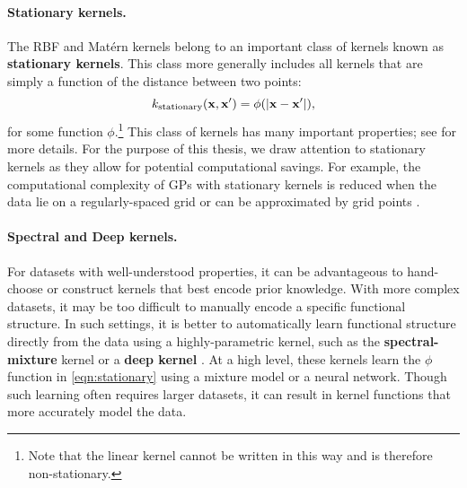 \paragraph{Stationary kernels.}
The RBF and Mat\'ern kernels belong to an important class of kernels known as {\bf stationary kernels}.
This class more generally includes all kernels that are simply a function of the distance between two points:
\begin{equation}
  k_\text{stationary} (\mathbf{x}, \mathbf{x}') = \phi( \vert \mathbf{x} - \mathbf{x}' \vert ),
  \label{eqn:stationary}
\end{equation}
for some function $\phi$.\footnote{
  Note that the linear kernel cannot be written in this way and is therefore non-stationary.
}
This class of kernels has many important properties; see \citep[e.g.][]{rasmussen2006gaussian,wilson2013gaussian} for more details.
For the purpose of this thesis, we draw attention to stationary kernels as they allow for potential computational savings.
For example, the computational complexity of GPs with stationary kernels is reduced when the data lie on a regularly-spaced grid \cite{cunningham2008fast,saatcci2012scalable} or can be approximated by grid points \cite{wilson2014thesis,wilson2015kernel}.


\paragraph{Spectral and Deep kernels.}
For datasets with well-understood properties, it can be advantageous to hand-choose or construct kernels that best encode prior knowledge.
With more complex datasets, it may be too difficult to manually encode a specific functional structure.
In such settings, it is better to automatically learn functional structure directly from the data using a highly-parametric kernel, such as the {\bf spectral-mixture} kernel \cite{wilson2013gaussian} or a {\bf deep kernel} \cite{wilson2016deep}.
At a high level, these kernels learn the $\phi$ function in \cref{eqn:stationary} using a mixture model or a neural network.
Though such learning often requires larger datasets, it can result in kernel functions that more accurately model the data.

